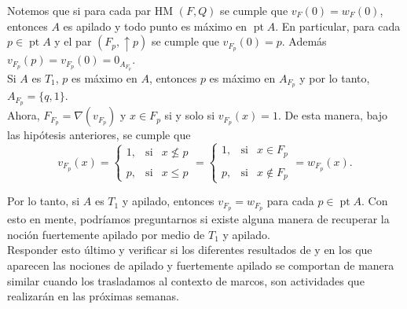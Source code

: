 \documentclass[12pt]{article}
\DeclareMathOperator{\pt}{pt}
\begin{document}
Notemos que si para cada par HM $(F, Q)$ se cumple que $v_F(0)=w_F(0)$, entonces $A$ es apilado y todo punto es máximo en $\pt A$.
En particular, para cada $p\in \pt A$ y el par $(F_p, \uparrow p)$ se cumple que $v_{F_p}(0)=p$. Además $v_{F_p}(p)=v_{F_p}(0)=0_{A_{F_p}}$. \\

Si $A$ es $T_1$, $p$ es máximo en $A$, entonces $p$ es máximo en $A_{F_p}$ y por lo tanto, $A_{F_p}=\{q, 1\}$.\\

Ahora, $F_{F_p}=\nabla(v_{F_p})$ y $x\in F_p$ si y solo si $v_{F_p}(x)=1$. De esta manera, bajo las hipótesis anteriores, se cumple que 
\[
v_{F_p}(x)= \left\{ \begin{array}{lcc} 1, & \text{si}  &  x\nleq p\\ \\ p, & \text{si} & x\leq p 
\end{array} \right.=  \left\{ \begin{array}{lcc} 1, & \text{si}  &  x\in F_p\\ \\ p, & \text{si} & x\not\in F_p \end{array} \right.=w_{F_p}(x).
\]

Por lo tanto, si $A$ es $T_1$ y apilado, entonces $v_{F_p}=w_{F_p}$ para cada $p\in \pt A$. Con esto en mente, podríamos preguntarnos si existe alguna manera de 
recuperar la noción fuertemente apilado por medio de $T_1$ y apilado.\\

Responder esto último y verificar si los diferentes resultados de \cite{simmons2004vietoris} y \cite{sexton2006ordinal} en los que aparecen las nociones de
apilado y fuertemente apilado se comportan de manera similar cuando los trasladamos al contexto de marcos, son actividades que realizarán en las próximas semanas.



\end{document}
